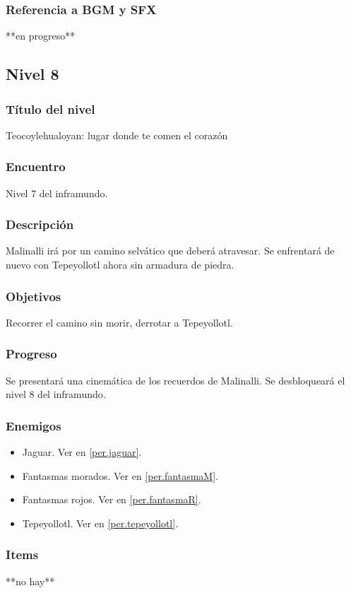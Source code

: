 \documentclass[11pt,letterpaper]{article}
\begin{document}
	\subsubsection{Referencia a BGM y SFX}
	**en progreso**
	
	
		\subsection{Nivel 8}
	\subsubsection{Título del nivel}
	Teocoylehualoyan: lugar donde te comen el corazón
	\subsubsection{Encuentro}
	Nivel 7 del inframundo.
	\subsubsection{Descripción}
	Malinalli irá por un camino selvático que deberá atravesar. Se enfrentará de nuevo con Tepeyollotl ahora sin armadura de piedra.
	\subsubsection{Objetivos}
	Recorrer el camino sin morir, derrotar a Tepeyollotl.
	\subsubsection{Progreso}
	Se presentará una cinemática de los recuerdos de Malinalli. Se desbloqueará el nivel 8 del inframundo.
	\subsubsection{Enemigos}
	\begin{itemize}
		\item Jaguar. Ver en \ref{per.jaguar}.
		\item Fantasmas morados. Ver en \ref{per.fantasmaM}.
		\item Fantasmas rojos. Ver en \ref{per.fantasmaR}.
		\item Tepeyollotl. Ver en \ref{per.tepeyollotl}.
	\end{itemize}
	\subsubsection{Items}
	**no hay**
\end{document}
